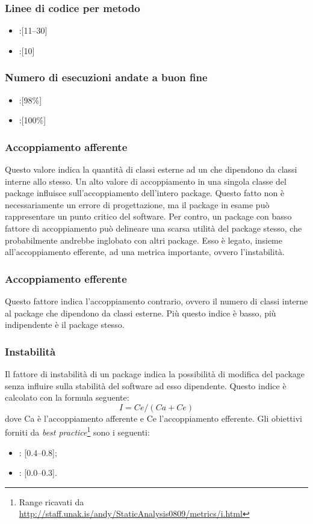 \subsubsection{Linee di codice per metodo}
\begin{itemize}
\item {}:[11--30]
\item {}:[10]
\end{itemize}

\subsubsection{Numero di esecuzioni andate a buon fine}
\begin{itemize}
\item {}:[98\%]
\item {}:[100\%]
\end{itemize}

\subsubsection{Accoppiamento afferente}
Questo valore indica la quantità di classi esterne ad un  che dipendono da classi interne allo stesso.
Un alto valore di accoppiamento in una singola classe del package influisce sull'accoppiamento dell'intero package. Questo fatto non è necessariamente un errore di progettazione, ma il package in esame può rappresentare un punto critico del software. Per contro, un package con basso fattore di accoppiamento può delineare una scarsa utilità del package stesso, che probabilmente andrebbe inglobato con altri package. Esso è legato, insieme all'accoppiamento efferente, ad una metrica importante, ovvero l'instabilità.

\subsubsection{Accoppiamento efferente}
Questo fattore indica l'accoppiamento contrario, ovvero il numero di classi interne al package che dipendono da classi esterne. Più questo indice è basso, più indipendente è il package stesso.

\subsubsection{Instabilità}
\label{4.2.8}
Il fattore di instabilità di un package indica la possibilità di modifica del package senza influire sulla stabilità del software ad esso dipendente.
Questo indice è calcolato con la formula seguente:
$$I = Ce / (Ca + Ce)$$
dove Ca è l'accoppiamento afferente e Ce l'accoppiamento efferente.
Gli obiettivi forniti da \emph{best practice}\footnote{Range ricavati da \url{http://staff.unak.is/andy/StaticAnalysis0809/metrics/i.html}} sono i seguenti:
\begin{itemize}
\item {}: [0.4--0.8];
\item {}: [0.0--0.3].
\end{itemize}

